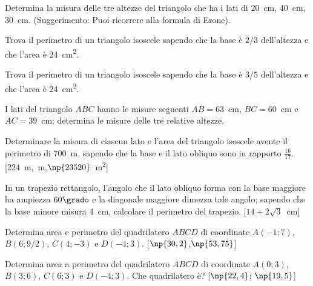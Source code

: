 \begin{multicols}{2}
\begin{esercizio}
\label{ese:7.78}
Determina la misura delle tre altezze del triangolo che ha i lati di 
20~cm, 40~cm, 30~cm. (Suggerimento: Puoi ricorrere alla formula di 
Erone).
\end{esercizio}

\begin{esercizio}
\label{ese:7.80}
Trova il perimetro di un triangolo isoscele sapendo che la base è 
$2/3$ dell'altezza e che l'area è 24~cm\textsuperscript{2}.
\end{esercizio}

\begin{esercizio}
\label{ese:7.81}
Trova il perimetro di un triangolo isoscele sapendo che la base è 
$3/5$ dell'altezza e che l'area è 24~cm\textsuperscript{2}.
\end{esercizio}

\begin{esercizio}
\label{ese:7.82}
I lati del triangolo $ABC$ hanno le misure seguenti $AB=63$~cm, 
$BC=60$~cm e $AC=39$~cm; determina le misure delle tre relative 
altezze.
\end{esercizio}

\begin{esercizio}
\label{ese:7.83}
Determinare la misura di ciascun lato e l'area del triangolo isoscele 
avente il perimetro di 700~m, sapendo che la base e il lato obliquo 
sono in rapporto $\frac{16}{17}$.
\hfill[224~m,~m,\quad $\np{23520}$~m\textsuperscript{2}]
\end{esercizio}

\begin{esercizio}
\label{ese:7.87}
In un trapezio rettangolo, l'angolo che il lato obliquo forma con la 
base maggiore ha ampiezza $60\grado$ e la diagonale maggiore dimezza 
tale angolo; sapendo che la base minore misura 4~cm,  calcolare il 
perimetro del trapezio.
\hfill[$14 + 2\sqrt{3}$~cm]
\end{esercizio}

\begin{esercizio}
\label{ese:7.91}
Determina area e perimetro del quadrilatero $ABCD$ di coordinate 
$A(-1;7)$, $B(6;9/2)$, $C(4;-3)$ e $D(-4;3)$.
\hfill[$\np{30,2}$,\quad $\np{53,75}$]
\end{esercizio}

\begin{esercizio}
\label{ese:7.92}
Determina area a perimetro del quadrilatero $ABCD$ di coordinate 
$A(0;3)$, $B(3;6)$, $C(6;3)$ e $D(-4;3)$. Che quadrilatero è?
\hfill[$\np{22,4}$; $\np{19,5}$]
\end{esercizio}


\end{multicols}
